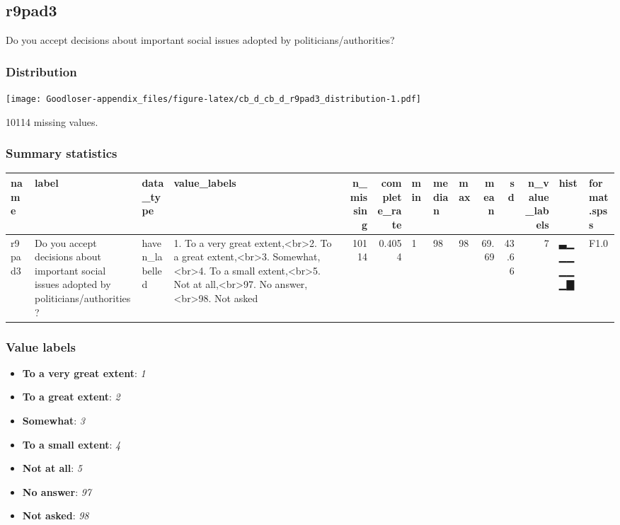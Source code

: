 \documentclass[
]{book}
\providecommand{\tightlist}{%
  \setlength{\itemsep}{0pt}\setlength{\parskip}{0pt}}
\begin{document}
\hypertarget{r9pad3}{%
\subsection{r9pad3}\label{r9pad3}}

Do you accept decisions about important social issues adopted by politicians/authorities?

\hypertarget{r9pad3_distribution}{%
\subsubsection{Distribution}\label{r9pad3_distribution}}

\texttt{[image: Goodloser-appendix\_files/figure-latex/cb\_d\_cb\_d\_r9pad3\_distribution-1.pdf]}

10114 missing values.

\hypertarget{r9pad3_summary}{%
\subsubsection{Summary statistics}\label{r9pad3_summary}}

\begin{tabular}{l|l|l|l|r|r|l|l|l|r|r|r|l|l}
\hline
name & label & data_type & value_labels & n_missing & complete_rate & min & median & max & mean & sd & n_value_labels & hist & format.spss\\
\hline
r9pad3 & Do you accept decisions about important social issues adopted by politicians/authorities? & haven_labelled & 1. To a very great extent,<br>2. To a great extent,<br>3. Somewhat,<br>4. To a small extent,<br>5. Not at all,<br>97. No answer,<br>98. Not asked & 10114 & 0.4054 & 1 & 98 & 98 & 69.69 & 43.66 & 7 & ▃▁▁▁▁▁▁▇ & F1.0\\
\hline
\end{tabular}

\hypertarget{r9pad3_labels}{%
\subsubsection{Value labels}\label{r9pad3_labels}}

\begin{itemize}
\tightlist
\item
  \textbf{To a very great extent}: \emph{1}
\item
  \textbf{To a great extent}: \emph{2}
\item
  \textbf{Somewhat}: \emph{3}
\item
  \textbf{To a small extent}: \emph{4}
\item
  \textbf{Not at all}: \emph{5}
\item
  \textbf{No answer}: \emph{97}
\item
  \textbf{Not asked}: \emph{98}
\end{itemize}
\end{document}
